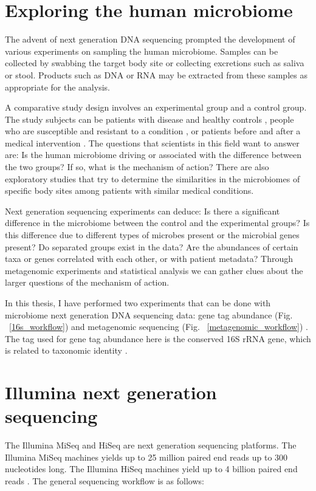 \section{Exploring the human microbiome}
The advent of next generation DNA sequencing prompted the development of various experiments on sampling the human microbiome. Samples can be collected by swabbing the target body site or collecting excretions such as saliva or stool. Products such as DNA or RNA may be extracted from these samples as appropriate for the analysis.

A comparative study design involves an experimental group and a control group. The study subjects can be patients with disease and healthy controls \cite{macklaim2013comparative}, people who are susceptible and resistant to a condition \cite{theriot2014antibiotic}, or patients before and after a medical intervention \cite{graessler2013metagenomic}. The questions that scientists in this field want to answer are: Is the human microbiome driving or associated with the difference between the two groups? If so, what is the mechanism of action? There are also exploratory studies that try to determine the similarities in the microbiomes of specific body sites among patients with similar medical conditions.

Next generation sequencing experiments can deduce: Is there a significant difference in the microbiome between the control and the experimental groups? Is this difference due to different types of microbes present or the microbial genes present? Do separated groups exist in the data? Are the abundances of certain taxa or genes correlated with each other, or with patient metadata? Through metagenomic experiments and statistical analysis we can gather clues about the larger questions of the mechanism of action.

In this thesis, I have performed two experiments that can be done with microbiome next generation DNA sequencing data: gene tag abundance (Fig. ~\ref{16s_workflow}) and metagenomic sequencing (Fig. ~\ref{metagenomic_workflow}) \cite{riesenfeld2004metagenomics}. The tag used for gene tag abundance here is the conserved 16S rRNA gene, which is related to taxonomic identity \cite{gloor2010microbiome}.

\section{Illumina next generation sequencing}
The Illumina MiSeq and HiSeq are next generation sequencing platforms. The Illumina MiSeq machines yields up to 25 million paired end reads up to 300 nucleotides long. The Illumina HiSeq machines yield up to 4 billion paired end reads \cite{bentley2008accurate}. The general sequencing workflow is as follows:

